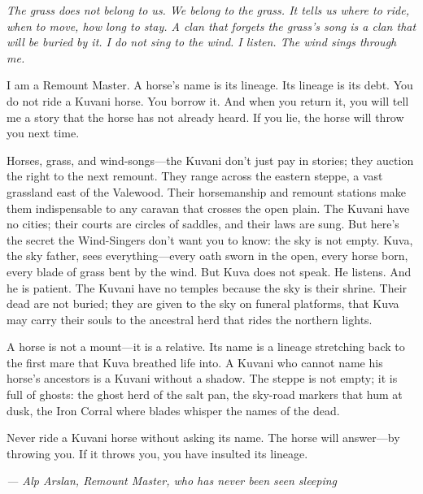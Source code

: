 \noindent
{\Large
\textit{The grass does not belong to us. We belong to the grass. It tells us where to ride, when to move, how long to stay. A clan that forgets the grass's song is a clan that will be buried by it. I do not sing to the wind. I listen. The wind sings through me.}

\vspace{0.5em}

I am a Remount Master. A horse's name is its lineage. Its lineage is its debt. You do not ride a Kuvani horse. You borrow it. And when you return it, you will tell me a story that the horse has not already heard. If you lie, the horse will throw you next time.

\vspace{0.5em}

Horses, grass, and wind-songs---the Kuvani don't just pay in stories; they auction the right to the next remount. They range across the eastern steppe, a vast grassland east of the Valewood. Their horsemanship and remount stations make them indispensable to any caravan that crosses the open plain. The Kuvani have no cities; their courts are circles of saddles, and their laws are sung. But here's the secret the Wind-Singers don't want you to know: the sky is not empty. Kuva, the sky father, sees everything---every oath sworn in the open, every horse born, every blade of grass bent by the wind. But Kuva does not speak. He listens. And he is patient. The Kuvani have no temples because the sky is their shrine. Their dead are not buried; they are given to the sky on funeral platforms, that Kuva may carry their souls to the ancestral herd that rides the northern lights.

\vspace{0.5em}

A horse is not a mount---it is a relative. Its name is a lineage stretching back to the first mare that Kuva breathed life into. A Kuvani who cannot name his horse's ancestors is a Kuvani without a shadow. The steppe is not empty; it is full of ghosts: the ghost herd of the salt pan, the sky-road markers that hum at dusk, the Iron Corral where blades whisper the names of the dead.

\vspace{0.5em}

Never ride a Kuvani horse without asking its name. The horse will answer---by throwing you. If it throws you, you have insulted its lineage.

\vspace{1em}

\noindent\textit{--- Alp Arslan, Remount Master, who has never been seen sleeping}
}

